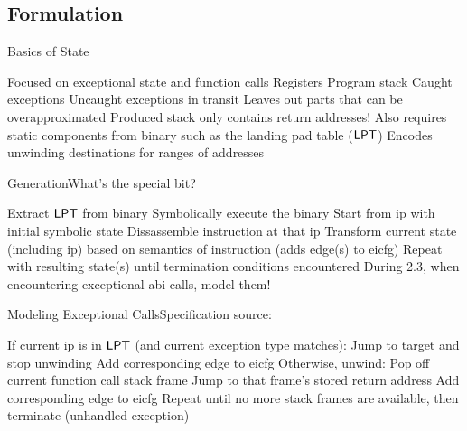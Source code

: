 \subsection{Formulation}
\begin{frame}{Basics of State}
  \begin{outline}
    \1 Focused on \alert{exceptional state} and \alert{function calls}
      \2 Registers
      \2 Program stack
      \2 \alert{Caught} exceptions
      \2 \alert{Uncaught} exceptions in transit
    \1 Leaves out parts that can be overapproximated
      \2 Produced stack only contains return addresses!
    \1 Also requires static components from binary such as the \alert{landing pad table ($\operatorname{\mathsf{LPT}}$)}
      \2 Encodes unwinding destinations for ranges of addresses
  \end{outline}
\end{frame}

\begin{frame}{Generation}{What's the special bit?}
  \begin{outline}[enumerate]
    \1 Extract $\operatorname{\mathsf{LPT}}$ from binary
    \1 \alert{Symbolically execute} the binary
      \2 Start from \gls{ip} with initial \alert{symbolic state}
      \2 Dissassemble instruction at that \gls{ip}
      \2 Transform current state (including \gls{ip}) based on semantics of instruction (adds edge(s) to \gls{eicfg})
      \2 Repeat with resulting state(s) until termination conditions encountered
    \1 \alert{During 2.3, when encountering exceptional \gls{abi} calls, model them!}
  \end{outline}
\end{frame}

\begin{frame}{Modeling Exceptional  Calls}{Specification source: }
  \begin{block}{}
    \begin{outline}[enumerate]
      \1 If current \gls{ip} is in $\operatorname{\mathsf{LPT}}$ (and current exception type matches):
        \2 Jump to target and stop unwinding
        \2 Add corresponding edge to \gls{eicfg}
      \1 Otherwise, unwind:
        \2 Pop off current function call stack frame
        \2 Jump to that frame's stored return address
        \2 Add corresponding edge to \gls{eicfg}
      \1 Repeat until no more stack frames are available, then terminate (\alert{unhandled exception})
    \end{outline}
  \end{block}
\end{frame}

